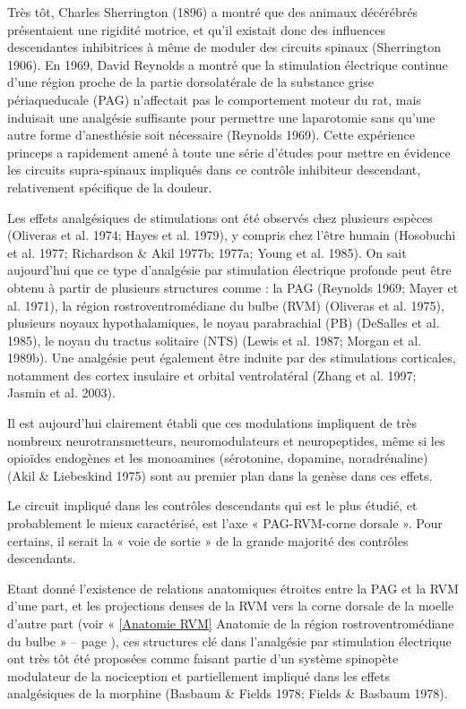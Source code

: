 \documentclass[a4paper,12pt,twoside]{report}
\begin{document}
Très tôt, Charles Sherrington (1896) a montré que des animaux décérébrés présentaient une rigidité motrice, et qu’il existait donc des influences descendantes inhibitrices à même de moduler des circuits spinaux (Sherrington 1906). En 1969, David Reynolds a montré que la stimulation électrique continue d’une région proche de la partie dorsolatérale de la substance grise périaqueducale (PAG) n’affectait pas le comportement moteur du rat, mais induisait une analgésie suffisante pour permettre une laparotomie sans qu’une autre forme d’anesthésie soit nécessaire (Reynolds 1969). Cette expérience princeps a rapidement amené à toute une série d’études pour mettre en évidence les circuits supra-spinaux impliqués dans ce contrôle inhibiteur descendant, relativement spécifique de la douleur.

Les effets analgésiques de stimulations ont été observés chez plusieurs espèces (Oliveras et al. 1974; Hayes et al. 1979), y compris chez l’être humain (Hosobuchi et al. 1977; Richardson \& Akil 1977b; 1977a; Young et al. 1985). On sait aujourd’hui que ce type d’analgésie par stimulation électrique profonde peut être obtenu à partir de plusieurs structures comme : la PAG (Reynolds 1969; Mayer et al. 1971), la région rostroventromédiane du bulbe (RVM) (Oliveras et al. 1975), plusieurs noyaux hypothalamiques, le noyau parabrachial (PB) (DeSalles et al. 1985), le noyau du tractus solitaire (NTS) (Lewis et al. 1987; Morgan et al. 1989b). Une analgésie peut également être induite par des stimulations corticales, notamment des cortex insulaire et orbital ventrolatéral (Zhang et al. 1997; Jasmin et al. 2003).

Il est aujourd’hui clairement établi que ces modulations impliquent de très nombreux neurotransmetteurs, neuromodulateurs et neuropeptides, même si les opioïdes endogènes et les monoamines (sérotonine, dopamine, noradrénaline) (Akil \& Liebeskind 1975) sont au premier plan dans la genèse dans ces effets.

\bigskip 

Le circuit impliqué dans les contrôles descendants qui est le plus étudié, et probablement le mieux caractérisé, est l’axe « PAG-RVM-corne dorsale ». Pour certains, il serait la « voie de sortie » de la grande majorité des contrôles descendants. 

Etant donné l’existence de relations anatomiques étroites entre la PAG et la RVM d’une part, et les projections denses de la RVM vers la corne dorsale de la moelle d’autre part (voir « \ref{Anatomie RVM} Anatomie de la région rostroventromédiane du bulbe » – page \pageref{Anatomie RVM}), ces structures clé dans l’analgésie par stimulation électrique ont très tôt été proposées comme faisant partie d’un système spinopète modulateur de la nociception et partiellement impliqué dans les effets analgésiques de la morphine (Basbaum \& Fields 1978; Fields \& Basbaum 1978).
\end{document}
